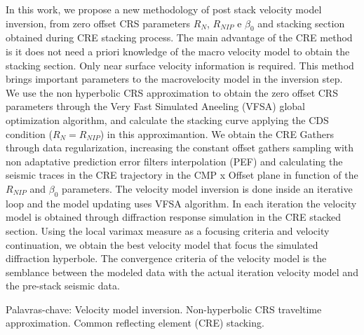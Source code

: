 \documentclass[
	12pt,				%
	openright,			%
	oneside,			%
	a4paper,			%
	english,			%
	brazil				%
	]{abntex2}
\begin{document}
\begin{resumo}
\OnehalfSpacing

In this work, we propose a new methodology of post stack velocity model inversion, from zero offset CRS parameters
$R_N$, $R_{NIP}$ e $\beta_0$ and stacking section obtained during CRE stacking process.
The main advantage of the CRE method is it does not need a priori knowledge of the macro velocity model to obtain the
stacking section. Only near surface velocity information is required.
This method brings important parameters to the macrovelocity model in the inversion step.
We use the non hyperbolic CRS approximation to obtain the zero offset 
CRS parameters through the Very Fast Simulated Aneeling (VFSA)
global optimization algorithm, and calculate the stacking curve applying the 
CDS condition ($R_N=R_{NIP}$) in this approximantion.
We obtain the CRE Gathers through data regularization, increasing the constant offset gathers sampling with
non adaptative prediction error filters interpolation (PEF) and calculating the seismic traces in the CRE trajectory in the 
CMP x Offset plane in function of the $R_{NIP}$ and $\beta_0$ parameters.
The velocity model inversion is done inside an iterative loop and the model updating uses VFSA algorithm.
In each iteration the velocity model is obtained through diffraction response simulation in the CRE stacked section.
Using the local varimax measure as a focusing criteria and velocity continuation, we obtain the best velocity model
that focus the simulated diffraction hyperbole.
The convergence criteria of the velocity model is the semblance between the modeled data with the 
actual iteration velocity model and the pre-stack seismic data.
\vspace{\onelineskip} 
\noindent 
 \par Palavras-chave: Velocity model inversion. Non-hyperbolic CRS traveltime approximation. 
 Common reflecting element (CRE) stacking. 
\end{resumo}

\renewcommand{\listfigurename}{\fontsize{12pt}{\baselineskip}\textbf{LISTA DE ILUSTRAÇÕES}}
\pdfbookmark[0]{\listfigurename}{lof}
\listoffigures*

\cleardoublepage

\tableofcontents*

\cleardoublepage
 
\mainmatter



\end{document}
